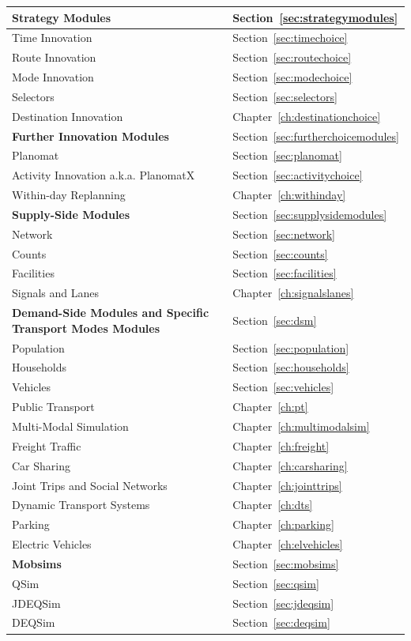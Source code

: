 {%
  \begin{tabular}[c]{|l|l|}
	\hline
	\textbf{Strategy Modules} & Section~\ref{sec:strategymodules} \\
	\hline
	Time Innovation & Section~\ref{sec:timechoice} \\
	Route Innovation & Section~\ref{sec:routechoice} \\
	Mode Innovation & Section~\ref{sec:modechoice} \\
	Selectors & Section~\ref{sec:selectors} \\
	Destination Innovation & Chapter~\ref{ch:destinationchoice} \\
	\hline
	\textbf{Further Innovation Modules} & Section~\ref{sec:furtherchoicemodules} \\
	\hline
	Planomat & Section~\ref{sec:planomat} \\
	Activity Innovation a.k.a. PlanomatX & Section~\ref{sec:activitychoice} \\
	Within-day Replanning & Chapter~\ref{ch:withinday} \\
	\hline
	\textbf{Supply-Side Modules} & Section~\ref{sec:supplysidemodules} \\
	\hline
	Network & Section~\ref{sec:network} \\
	Counts & Section~\ref{sec:counts} \\
	Facilities & Section~\ref{sec:facilities} \\
	Signals and Lanes & Chapter~\ref{ch:signalslanes} \\
	\hline
	\textbf{Demand-Side Modules and Specific Transport Modes Modules} & Section~\ref{sec:dsm} \\
	\hline
	Population & Section~\ref{sec:population} \\
	Households & Section~\ref{sec:households} \\
	Vehicles & Section~\ref{sec:vehicles} \\
	Public Transport & Chapter~\ref{ch:pt} \\
	Multi-Modal Simulation & Chapter~\ref{ch:multimodalsim} \\
	Freight Traffic & Chapter~\ref{ch:freight} \\
	Car Sharing & Chapter~\ref{ch:carsharing} \\
	Joint Trips and Social Networks & Chapter~\ref{ch:jointtrips} \\
	Dynamic Transport Systems & Chapter~\ref{ch:dts} \\
	Parking & Chapter~\ref{ch:parking} \\
	Electric Vehicles & Chapter~\ref{ch:elvehicles} \\
	\hline
	\textbf{Mobsims} & Section~\ref{sec:mobsims} \\
	\hline
	QSim & Section~\ref{sec:qsim} \\
	JDEQSim & Section~\ref{sec:jdeqsim} \\
	DEQSim & Section~\ref{sec:deqsim} \\
	\hline
	\end{tabular}
}%
{}

